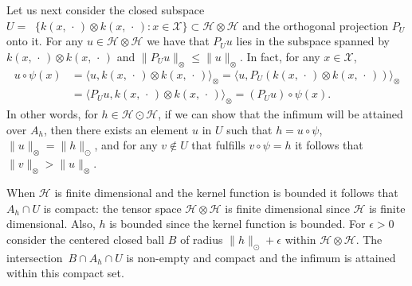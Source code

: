 \documentclass[AHL,Unicode,longabstracts,published]{cedram}
\theoremstyle{remark}
\DeclareMathOperator{\cspn}{\overline{span}}
\newcommand{\X}{\mathcal{X}}
\newcommand{\cH}{\mathcal{H}}
\begin{document}
Let us next consider the closed subspace $U = \cspn \{ k(x,\,\cdot\,) \otimes k(x,\,\cdot\,) : x \in \X\} \subset \cH \otimes \cH$ and the orthogonal projection $P_U$ onto it. For any $u \in \cH \otimes \cH$ we have that $P_U u $ lies in the subspace spanned by $k(x,\,\cdot\,) \otimes k(x,\,\cdot\,)$ and $\|P_U u\|_\otimes \leq \|u\|_\otimes$. In fact, for any $x \in \X$,
\begin{align*}
u \circ \psi(x) &= \langle u, k(x,\,\cdot\,) \otimes k(x,\,\cdot\,) \rangle_\otimes = \langle u, P_U(k(x,\,\cdot\,) \otimes k(x,\,\cdot\,)) \rangle_\otimes \\
&= \langle P_U u, k(x,\,\cdot\,) \otimes k(x,\,\cdot\,) \rangle_\otimes = (P_U u) \circ \psi(x).
\end{align*}
In other words, for $h \in \cH \odot \cH$, if we can show that the infimum will be attained over $A_h$, then there exists an element $u$ in $U$ such that $h =u \circ \psi$, $\|u\|_\otimes = \|h\|_\odot$, and for any $v \not \in U$ that fulfills $v \circ \psi = h$ it follows that $\|v\|_\otimes > \|u\|_\otimes$.

When $\cH$ is finite dimensional and the kernel function is bounded it follows that $A_h \cap U$ is compact: the tensor space $\cH \otimes \cH$ is finite dimensional since $\cH$ is finite dimensional. Also, $h$ is bounded since the kernel function is bounded. For $\epsilon>0$ consider the centered closed ball $B$ of radius $\|h\|_\odot + \epsilon$ within $\cH \otimes \cH$. The intersection~$B\cap A_h \cap U$ is non-empty and compact and the infimum is attained within this compact set.
\end{document}
